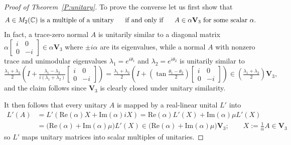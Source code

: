 \documentclass[11pt]{article}
\numberwithin{equation}{section}
\def\IC{{\mathbb C}}
\def\bV{{\mathbf V}}
\def\bV{{\mathbf V}}
\begin{document}
\begin{proof}[Proof of Theorem~\ref{P:unitary}]
To prove the converse let us first show that
\begin{equation}\label{eq:unitary-in-2-by-2}
A\in M_2(\IC)\hbox{ is a multiple of a unitary \ \ \ \  if and only if \ \  \ \ } A\in\alpha\bV_3\hbox{ for some scalar $\alpha$.}
\end{equation} In fact, a trace-zero normal $A$ is unitarily  similar to a diagonal matrix $\alpha\left[\begin{matrix}
  i &0\\
  0& -i                                                                                                                                                                     \end{matrix}\right]\in\alpha\bV_3$ where $\pm i\alpha$ are its eigenvalues, while a normal $A$ with nonzero trace and unimodular eigenvalues $\lambda_1=e^{i\theta_1}$ and $\lambda_2=e^{i\theta_2}$ is unitarily similar to
  $$\tfrac{\lambda_1+\lambda_2}{2}\left(I+\tfrac{\lambda_1-\lambda_2}{i(\lambda_1+\lambda_2)}\left[\begin{matrix}
  i &0\\
  0& -i                                                                                                                                                                     \end{matrix}\right]\right)=\tfrac{\lambda_1+\lambda_2}{2}\left(I+(\tan\tfrac{\theta_1-\theta_2}{2})\left[\begin{matrix}
  i &0\\
  0& -i                                                                                                                                                                     \end{matrix}\right]\right)\in(\tfrac{\lambda_1+\lambda_2}{2})\bV_3,$$ and the claim follows since $\bV_3$ is clearly closed under unitary similarity.

  It then follows that every unitary  $A$ is mapped by a real-linear unital $L'$
   into
  \begin{equation*}
   \begin{aligned}
   L'(A)&=L'(\mathrm{Re}(\alpha)X+\mathrm{Im}(\alpha)iX)=\mathrm{Re}(\alpha)L'(X)+\mathrm{Im}(\alpha)\mu L'(X)\\
   &=\bigl(\mathrm{Re}(\alpha)+\mathrm{Im}(\alpha)\mu)L'(X)\in\bigl(\mathrm{Re}(\alpha)+\mathrm{Im}(\alpha)\mu)\bV_3;\qquad X:=\tfrac{1}{\alpha}A\in\bV_3
  \end{aligned}
  \end{equation*}
so $L'$ maps unitary matrices into scalar multiples of unitaries.
\end{proof}
\end{document}
